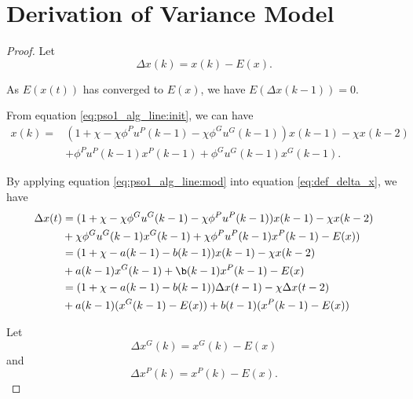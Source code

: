 \section{Derivation of Variance Model}
\label{sec:app:derivation_variance}

\begin{proof}

Let
\begin{equation}
\label{eq:def_delta_x}
\Delta x(k) = x(k) - E(x).
\end{equation}

As $ E(x(t)) $ has converged to $ E(x) $, we have $ E( \Delta x(k-1) ) = 0 $.

From equation \eqref{eq:pso1_alg_line:init}, we can have
\begin{equation}
\label{eq:pso1_alg_line:mod}
\begin{aligned}
x(k) = & (1 + \chi - \chi \phi^{P} u^{P}(k-1) - \chi \phi^{G} u^{G}(k-1) ) x(k-1) - \chi x(k-2) \\
& + \phi^{P} u^{P}(k-1) x^{P}(k-1) + \phi^{G} u^{G}(k-1) x^{G}(k-1).
\end{aligned}
\end{equation}

By applying equation \eqref{eq:pso1_alg_line:mod} into equation \eqref{eq:def_delta_x}, we have
\begin{equation}
\label{eq:delta_pos_alg_line:init}
\begin{aligned}
\Delta x(t) & = ( 1 + \chi - \chi \phi^{G} u^{G}(k-1) - \chi \phi^{P} u^{P}(k-1) ) x(k-1) - \chi x(k-2)  \\
& + \chi \phi^{G} u^{G}(k-1) x^{G}(k-1) + \chi \phi^{P} u^{P}(k-1) x^{P}(k-1) - E(x)) \\
& = (1 + \chi - a(k-1) - b(k-1) ) x(k-1) - \chi x(k-2) \\
& + a(k-1) x^{G}(k-1) + \b(k-1) x^{P}(k-1) - E(x) \\
& = (1 + \chi - a(k-1) - b(k-1) ) \Delta x(t-1)  - \chi \Delta x(t-2) \\
& + a(k-1) ( x^{G}(k-1) - E(x) ) + b(t-1) ( x^{P}(k-1) - E(x) )
\end{aligned}
\end{equation}

Let 
\begin{equation}
\label{eq:delta_x_g}
\Delta x^{G}(k) =  x^{G}(k) - E(x)
\end{equation}
and
\begin{equation}
\label{eq:delta_x_p}
\Delta x^{P}(k) =  x^{P}(k) - E(x).
\end{equation}


\end{proof}
